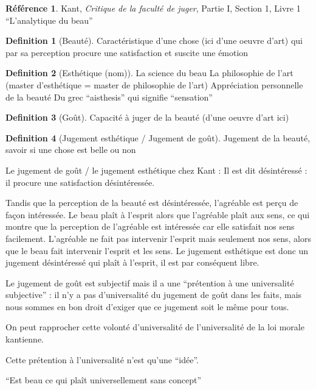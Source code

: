 \documentclass[french]{book}
\theoremstyle{definition}
\newtheorem*{dfn}{Definition}
\newtheorem*{refe}{Référence}
\begin{document}
\begin{refe}
	Kant, \textit{Critique de la faculté de juger}, Partie I, Section 1, Livre 1 “L’analytique du beau”
\end{refe}

\begin{dfn}[Beauté]
Caractéristique d’une chose (ici d’une oeuvre d’art) qui par sa perception procure une satisfaction et suscite une émotion
\end{dfn}

\begin{dfn}[Esthétique (nom)]
La science du beau
La philosophie de l’art (master d’esthétique = master de philosophie de l’art)
Appréciation personnelle de la beauté
Du grec “aisthesis” qui signifie “sensation”
\end{dfn}

\begin{dfn}[Goût]
Capacité à juger de la beauté (d’une oeuvre d’art ici)
\end{dfn}

\begin{dfn}[Jugement esthétique / Jugement de goût]
Jugement de la beauté, savoir si une chose est belle ou non
\end{dfn}

Le jugement de goût / le jugement esthétique chez Kant :
Il est dit désintéressé : il procure une satisfaction désintéressée.

Tandis que la perception de la beauté est désintéressée, l’agréable est perçu de façon intéressée. Le beau plaît à l’esprit alors que l'agréable plaît aux sens, ce qui montre que la perception de l’agréable est intéressée car elle satisfait nos sens facilement. L’agréable ne fait pas intervenir l’esprit mais seulement nos sens, alors que le beau fait intervenir l’esprit et les sens. Le jugement esthétique est donc un jugement désintéressé qui plaît à l’esprit, il est par conséquent libre.

Le jugement de goût est subjectif mais il a une “prétention à une universalité subjective” : il n’y a pas d’universalité du jugement de goût dans les faits, mais nous sommes en bon droit d’exiger que ce jugement soit le même pour tous.

On peut rapprocher cette volonté d’universalité de l’universalité de la loi morale kantienne.

Cette prétention à l’universalité n’est qu’une “idée”.

“Est beau ce qui plaît universellement sans concept”
\end{document}
